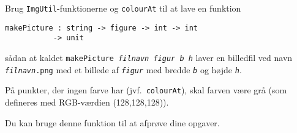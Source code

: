 Brug \texttt{ImgUtil}-funktionerne og \texttt{colourAt} til at lave en
  funktion

  \vspace{-4mm}
\begin{verbatim}
makePicture : string -> figure -> int -> int
           -> unit
\end{verbatim}
  \vspace{-4mm}
  
  \noindent
  sådan at kaldet \texttt{makePicture \emph{filnavn figur b h}} laver en
  billedfil ved navn \texttt{\emph{filnavn}.png} med et billede af
  \texttt{\emph{figur}} med bredde \texttt{\emph{b}} og højde
  \texttt{\emph{h}}.
  
  På punkter, der ingen farve har (jvf.\ \texttt{colourAt}), skal farven
  være grå (som defineres med RGB-værdien (128,128,128)).
  
  Du kan bruge denne funktion til at afprøve dine opgaver.
